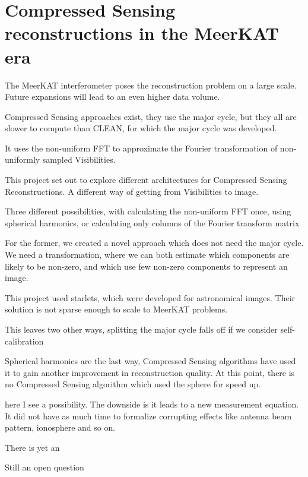 \section{Compressed Sensing reconstructions in the MeerKAT era}
The MeerKAT interferometer poses the reconstruction problem on a large scale. Future expansions will lead to an even higher data volume.

 Compressed Sensing approaches exist, they use the major cycle, but they all are slower to compute than CLEAN, for which the major cycle was developed. 

It uses the non-uniform FFT to approximate the Fourier transformation of non-uniformly sampled Visibilities.

This project set out to explore different architectures for Compressed Sensing Reconstructions. A different way of getting from Visibilities to image. 

Three different possibilities, with calculating the non-uniform FFT once, using spherical harmonics, or calculating only columns of the Fourier transform matrix

For the former, we created a novel approach which does not need the major cycle. We need a transformation, where we can both estimate which components are likely to be non-zero, and which use few non-zero components to represent an image.

This project used starlets, which were developed for astronomical images. Their solution is not sparse enough to scale to MeerKAT problems.

This leaves two other ways, splitting the major cycle falls off if we consider self-calibration



Spherical harmonics are the last way,
Compressed Sensing algorithms have used it to gain another improvement in reconstruction quality. At this point, there is no Compressed Sensing algorithm which used the sphere for speed up.

here I see a possibility. The downside is it leads to a new measurement equation. It did not have as much time to formalize corrupting effects like antenna beam pattern, ionosphere and so on.

There is yet an



 
Still an open question








